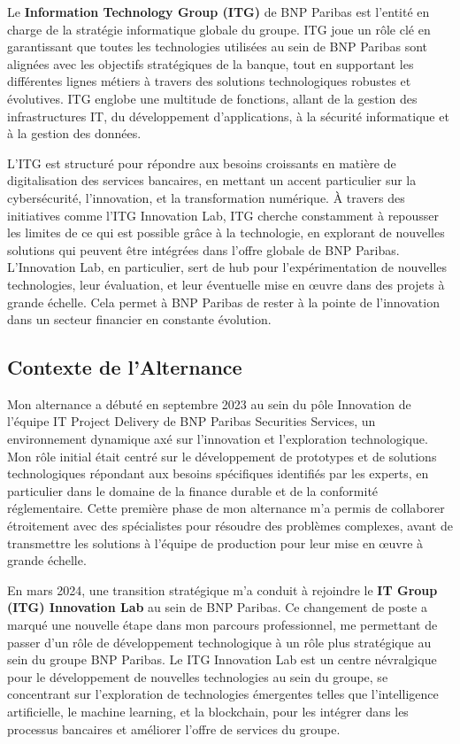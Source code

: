 \documentclass[13pt,a4paper]{article}
\begin{document}
Le \textbf{Information Technology Group (ITG)} de BNP Paribas est l'entité en charge de la stratégie informatique globale du groupe. ITG joue un rôle clé en garantissant que toutes les technologies utilisées au sein de BNP Paribas sont alignées avec les objectifs stratégiques de la banque, tout en supportant les différentes lignes métiers à travers des solutions technologiques robustes et évolutives. ITG englobe une multitude de fonctions, allant de la gestion des infrastructures IT, du développement d'applications, à la sécurité informatique et à la gestion des données.

L'ITG est structuré pour répondre aux besoins croissants en matière de digitalisation des services bancaires, en mettant un accent particulier sur la cybersécurité, l'innovation, et la transformation numérique. À travers des initiatives comme l'ITG Innovation Lab, ITG cherche constamment à repousser les limites de ce qui est possible grâce à la technologie, en explorant de nouvelles solutions qui peuvent être intégrées dans l'offre globale de BNP Paribas. L'Innovation Lab, en particulier, sert de hub pour l'expérimentation de nouvelles technologies, leur évaluation, et leur éventuelle mise en œuvre dans des projets à grande échelle. Cela permet à BNP Paribas de rester à la pointe de l'innovation dans un secteur financier en constante évolution.

\subsection{Contexte de l'Alternance} 
Mon alternance a débuté en septembre 2023 au sein du pôle Innovation de l'équipe IT Project Delivery de BNP Paribas Securities Services, un environnement dynamique axé sur l'innovation et l'exploration technologique. Mon rôle initial était centré sur le développement de prototypes et de solutions technologiques répondant aux besoins spécifiques identifiés par les experts, en particulier dans le domaine de la finance durable et de la conformité réglementaire. Cette première phase de mon alternance m'a permis de collaborer étroitement avec des spécialistes pour résoudre des problèmes complexes, avant de transmettre les solutions à l'équipe de production pour leur mise en œuvre à grande échelle.

En mars 2024, une transition stratégique m'a conduit à rejoindre le \textbf{IT Group (ITG) Innovation Lab} au sein de BNP Paribas. Ce changement de poste a marqué une nouvelle étape dans mon parcours professionnel, me permettant de passer d'un rôle de développement technologique à un rôle plus stratégique au sein du groupe BNP Paribas. Le ITG Innovation Lab est un centre névralgique pour le développement de nouvelles technologies au sein du groupe, se concentrant sur l'exploration de technologies émergentes telles que l'intelligence artificielle, le machine learning, et la blockchain, pour les intégrer dans les processus bancaires et améliorer l'offre de services du groupe.
\end{document}
